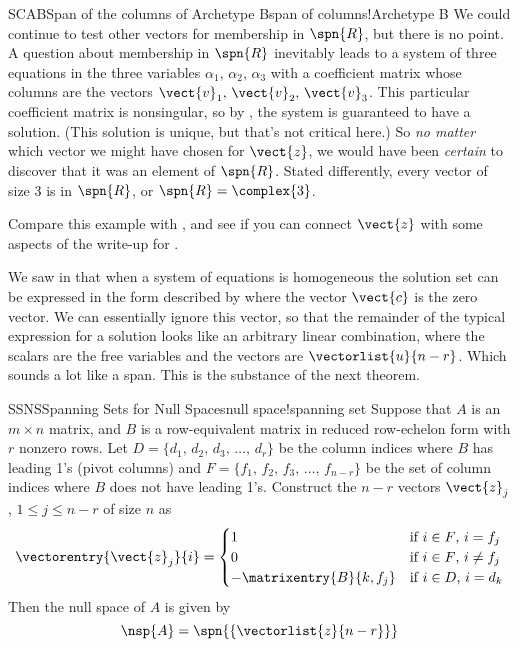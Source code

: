 \begin{example}{SCAB}{Span of the columns of Archetype B}{span of columns!Archetype B}
We could continue to test other vectors for membership in $\spn{R}$, but there is no point.   A question about membership in $\spn{R}$ inevitably leads to a system of three equations in the three variables $\alpha_1,\,\alpha_2,\,\alpha_3$ with a coefficient matrix whose columns are the vectors $\vect{v}_1,\,\vect{v}_2,\,\vect{v}_3$.  This particular coefficient matrix is nonsingular, so by , the system is guaranteed to have a solution.  (This solution is unique, but that's not critical here.)  So {\em no matter} which vector we might have chosen for $\vect{z}$, we would have been {\em certain} to discover that it was an element of $\spn{R}$.  Stated differently, every vector of size 3 is in $\spn{R}$, or $\spn{R}=\complex{3}$.\par
%
Compare this example with , and see if you can connect $\vect{z}$ with some aspects of the write-up for .
%
\end{example}
%
%
We saw in  that when a system of equations is homogeneous the solution set can be expressed in the form described by  where the vector $\vect{c}$ is the zero vector.  We can essentially ignore this vector, so that the remainder of the typical expression for a solution looks like an arbitrary linear combination, where the scalars are the free variables and the vectors are $\vectorlist{u}{n-r}$.  Which sounds a lot like a span.  This is the substance of the next theorem.
%
\begin{theorem}{SSNS}{Spanning Sets for Null Spaces}{null space!spanning set}
Suppose that $A$ is an $m\times n$ matrix, and $B$ is a row-equivalent matrix in reduced row-echelon form with $r$ nonzero rows.  Let $D=\{d_1,\,d_2,\,d_3,\,\ldots,\,d_r\}$ be the column indices where $B$ has leading 1's (pivot columns) and $F=\{f_1,\,f_2,\,f_3,\,\ldots,\,f_{n-r}\}$ be the set of column indices where $B$ does not have leading 1's.  Construct the $n-r$ vectors $\vect{z}_j$, $1\leq j\leq n-r$ of size $n$ as
%
\begin{equation*}
\vectorentry{\vect{z}_j}{i}=
\begin{cases}
1&\text{if $i\in F$, $i=f_j$}\\
0&\text{if $i\in F$, $i\neq f_j$}\\
-\matrixentry{B}{k,f_j}&\text{if $i\in D$, $i=d_k$}
\end{cases}
\end{equation*}
%
Then the null space of $A$ is given by
%
\begin{equation*}
\nsp{A}=\spn{\left\{\vectorlist{z}{n-r}\right\}}
\end{equation*}
%
\end{theorem}
